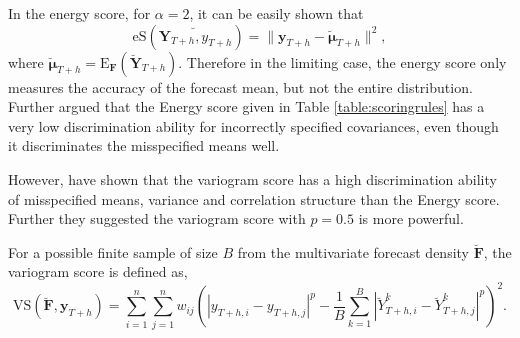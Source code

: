 \documentclass[a4paper, 11pt]{article}
\def\E{\text{E}}
\begin{document}
In the energy score, for $\alpha=2$, it can be easily shown that
\begin{equation} \label{eq:(5.1)}
\text{eS}(\breve{\bm{Y}_{T+h},y_{T+h}}) = \|\bm{y}_{T+h}-\breve{\bm{\mu}}_{T+h}\|^2,
\end{equation}
where $\breve{\bm{\mu}}_{T+h} =\E_{\bm{F}}(\breve{\bm{Y}}_{T+h}) $. Therefore in the limiting case, the energy score only measures the accuracy of the forecast mean, but not the entire distribution. Further \citet{Pinson2013a} argued that the Energy score given in Table \ref{table:scoringrules} has a very low discrimination ability for incorrectly specified covariances, even though it discriminates the misspecified means well.

However, \citet{SCHEUERER2015} have shown that the variogram score has a high discrimination ability of misspecified means, variance and correlation structure than the Energy score. Further they suggested the variogram score with $p=0.5$ is more powerful.

For a possible finite sample of size $B$ from the multivariate forecast density $\breve{\bm{F}}$, the variogram score is defined as,
\begin{equation}
\text{VS}(\breve{\bm{F}}, \bm{y}_{T+h}) = \displaystyle\sum_{i=1}^{n}\displaystyle\sum_{j=1}^{n}w_{ij}\left(|y_{T+h,i} - y_{T+h,j}|^p - \frac{1}{B} \displaystyle\sum_{k=1}^{B} |\breve{Y}^k_{T+h,i}-\breve{Y}^k_{T+h,j}|^p\right)^2.
\end{equation}




%
\end{document}
